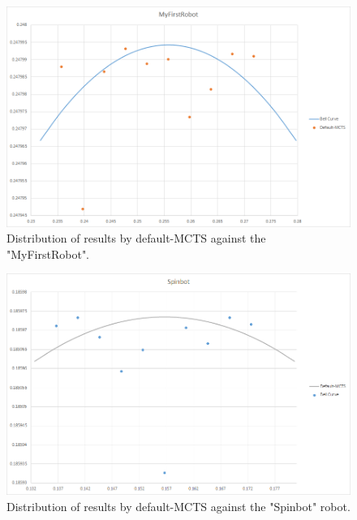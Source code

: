 \begin{figure}[htp]
\centerline{\includegraphics[width=\columnwidth]{Images/MyFirstRobotDistribution}}
\caption{Distribution of results by default-MCTS against the "MyFirstRobot".}
\label{figure--Distribution-MFR}
\end{figure}

\begin{figure}[htp]
\centerline{\includegraphics[width=\columnwidth]{Images/SpinbotDistribution}}
\caption{Distribution of results by default-MCTS against the "Spinbot" robot.}
\label{figure--Distribution-Spinbot}
\end{figure}

